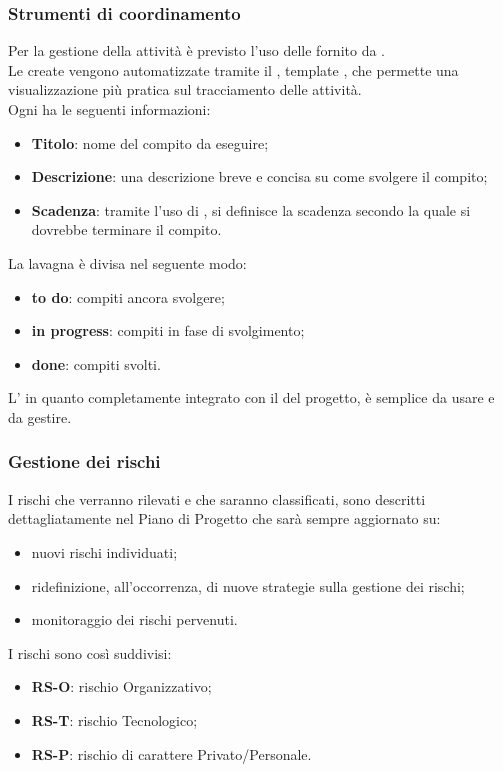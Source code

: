 		 \subsubsection{Strumenti di coordinamento}
		 Per la gestione della attività è previsto l'uso delle  fornito da . \\
		 Le  create vengono automatizzate tramite il , template , che permette una visualizzazione più pratica sul tracciamento delle attività. \\
		 Ogni  ha le seguenti informazioni:
		 \begin{itemize}
		 	\item {\bfseries Titolo}: nome del compito da eseguire;
		 	\item {\bfseries Descrizione}: una descrizione breve e concisa su come svolgere il compito;
		 	\item {\bfseries Scadenza}: tramite l'uso di , si definisce la scadenza secondo la quale si dovrebbe terminare il compito.
		 \end{itemize}
		 La lavagna è divisa nel seguente modo:
		 \begin{itemize}
		 	\item {\bfseries to do}: compiti ancora svolgere;
		 	\item {\bfseries in progress}: compiti in fase di svolgimento;
		 	\item {\bfseries done}: compiti svolti.	
		 	\end{itemize}
	 	L' in quanto completamente integrato con il  del progetto, è semplice da usare e da gestire.
		 \subsubsection{Gestione dei rischi}
		 I rischi che verranno rilevati e che saranno classificati, sono descritti dettagliatamente nel Piano di Progetto che sarà sempre aggiornato su:
		 \begin{itemize}
		 	\item nuovi rischi individuati;
		 	\item ridefinizione, all'occorrenza, di nuove strategie sulla gestione dei rischi;
		 	\item monitoraggio dei rischi pervenuti. \\ 
		 \end{itemize}
	 	\noindent
	 	I rischi sono così suddivisi:
	 	\begin{itemize}
	 		\item {\bfseries RS-O}: rischio Organizzativo;
	 		\item {\bfseries RS-T}: rischio Tecnologico;
	 		\item {\bfseries RS-P}: rischio di carattere Privato/Personale. \\
	 	\end{itemize}
	 	
